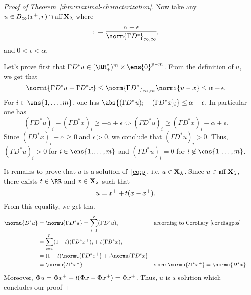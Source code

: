 \begin{proof}[Proof of Theorem~\ref{thm:maximal-characterization}]
  Now take any $u \in B_\infty(x^+, r) \cap \operatorname{aff} \mathbf{X}_{\lambda}$ where
  \begin{equation*}
    r = \frac{\alpha - \epsilon}{\norm{\Gamma D^*}_{\infty,\infty}},
  \end{equation*}
  and $0 < \epsilon < \alpha$.

  Let's prove first that $\Gamma D^* u \in (\RR_+^*)^m \times \ens{0}^{p-m}$.
  From the definition of $u$, we get that
  \begin{equation*}
    \normi{\Gamma D^* u - \Gamma D^* x} \leq \norm{\Gamma D^*}_{\infty,\infty} \normi{u - x} \leq \alpha - \epsilon .
  \end{equation*}
  For $i \in \ens{1,\dots,m}$, one has $\abs{(\Gamma D^* u)_i - (\Gamma D^* x)_i} \leq \alpha - \epsilon$. In particular one has
  \begin{equation*}
    (\Gamma D^* u)_i - (\Gamma D^* x)_i \geq -\alpha + \epsilon \Leftrightarrow (\Gamma D^* u)_i \geq (\Gamma D^* x)_i - \alpha + \epsilon .
  \end{equation*}
  Since $(\Gamma D^* x)_i - \alpha \geq 0$ and $\epsilon > 0$, we conclude that $(\Gamma D^* u)_i > 0$.
  Thus, $(\Gamma D^* u)_i > 0$ for $i \in \ens{1,\dots,m}$ and $(\Gamma D^* u)_i = 0$ for $i \not\in \ens{1,\dots,m}$.

  It remains to prove that $u$ is a solution of~\eqref{eq:p}, i.e. $u \in \mathbf{X}_{\lambda}$.
  Since $u \in \operatorname{aff} \mathbf{X}_{\lambda}$, there exists $t \in \RR$ and $x \in \mathbf{X}_{\lambda}$ such that
  \begin{equation*}
    u = x^+ + t (x - x^+) .
  \end{equation*}
  From this equality, we get that
  \begin{align*}
    \normu{D^* u} &= \normu{\Gamma D^* u} = \sum_{i=1}^p (\Gamma D^* u)_i && \text{according to Corollary~\ref{cor:diagpos}}  \\
                  &= \sum_{i=1}^p (1-t) (\Gamma D^* \maxx)_i + t (\Gamma D^* x)_i && \\
                  &= (1-t) \normu{\Gamma D^* \maxx} + t \normu{\Gamma D^* x} && \\
                  &= \normu{D^* \maxx} && \text{since } \normu{D^* \maxx} = \normu{D^* x} .
  \end{align*}
  Moreover, $\Phi u = \Phi x^+ + t(\Phi x - \Phi x^+) = \Phi x^+$.
  Thus, $u$ is a solution which concludes our proof.
\end{proof}
